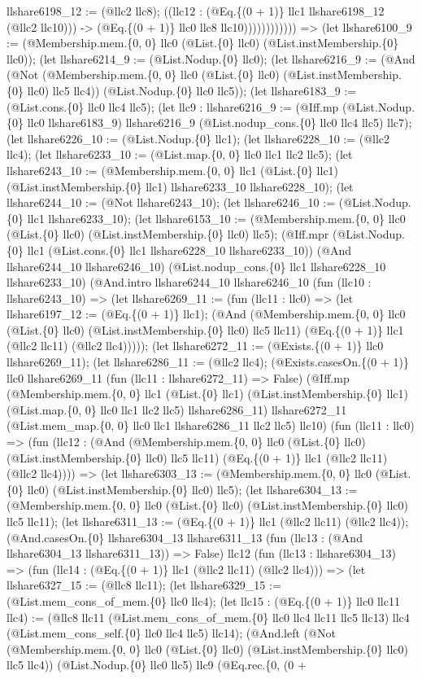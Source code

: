 \documentclass[11pt]{article}
\begin{document}
llshare6198\_12 := (@llc2 llc8); ((llc12 : (@Eq.\{(0 + 1)\} llc1 llshare6198\_12 (@llc2 llc10))) -> (@Eq.\{(0 + 1)\} llc0 llc8 llc10)))))))))))) => (let llshare6100\_9 := (@Membership.mem.\{0, 0\} llc0 (@List.\{0\} llc0) (@List.instMembership.\{0\} llc0)); (let llshare6214\_9 := (@List.Nodup.\{0\} llc0); (let llshare6216\_9 := (@And (@Not (@Membership.mem.\{0, 0\} llc0 (@List.\{0\} llc0) (@List.instMembership.\{0\} llc0) llc5 llc4)) (@List.Nodup.\{0\} llc0 llc5)); (let llshare6183\_9 := (@List.cons.\{0\} llc0 llc4 llc5); (let llc9 : llshare6216\_9 := (@Iff.mp (@List.Nodup.\{0\} llc0 llshare6183\_9) llshare6216\_9 (@List.nodup\_cons.\{0\} llc0 llc4 llc5) llc7); (let llshare6226\_10 := (@List.Nodup.\{0\} llc1); (let llshare6228\_10 := (@llc2 llc4); (let llshare6233\_10 := (@List.map.\{0, 0\} llc0 llc1 llc2 llc5); (let llshare6243\_10 := (@Membership.mem.\{0, 0\} llc1 (@List.\{0\} llc1) (@List.instMembership.\{0\} llc1) llshare6233\_10 llshare6228\_10); (let llshare6244\_10 := (@Not llshare6243\_10); (let llshare6246\_10 := (@List.Nodup.\{0\} llc1 llshare6233\_10); (let llshare6153\_10 := (@Membership.mem.\{0, 0\} llc0 (@List.\{0\} llc0) (@List.instMembership.\{0\} llc0) llc5); (@Iff.mpr (@List.Nodup.\{0\} llc1 (@List.cons.\{0\} llc1 llshare6228\_10 llshare6233\_10)) (@And llshare6244\_10 llshare6246\_10) (@List.nodup\_cons.\{0\} llc1 llshare6228\_10 llshare6233\_10) (@And.intro llshare6244\_10 llshare6246\_10 (fun (llc10 : llshare6243\_10) => (let llshare6269\_11 := (fun (llc11 : llc0) => (let llshare6197\_12 := (@Eq.\{(0 + 1)\} llc1); (@And (@Membership.mem.\{0, 0\} llc0 (@List.\{0\} llc0) (@List.instMembership.\{0\} llc0) llc5 llc11) (@Eq.\{(0 + 1)\} llc1 (@llc2 llc11) (@llc2 llc4))))); (let llshare6272\_11 := (@Exists.\{(0 + 1)\} llc0 llshare6269\_11); (let llshare6286\_11 := (@llc2 llc4); (@Exists.casesOn.\{(0 + 1)\} llc0 llshare6269\_11 (fun (llc11 : llshare6272\_11) => False) (@Iff.mp (@Membership.mem.\{0, 0\} llc1 (@List.\{0\} llc1) (@List.instMembership.\{0\} llc1) (@List.map.\{0, 0\} llc0 llc1 llc2 llc5) llshare6286\_11) llshare6272\_11 (@List.mem\_map.\{0, 0\} llc0 llc1 llshare6286\_11 llc2 llc5) llc10) (fun (llc11 : llc0) => (fun (llc12 : (@And (@Membership.mem.\{0, 0\} llc0 (@List.\{0\} llc0) (@List.instMembership.\{0\} llc0) llc5 llc11) (@Eq.\{(0 + 1)\} llc1 (@llc2 llc11) (@llc2 llc4)))) => (let llshare6303\_13 := (@Membership.mem.\{0, 0\} llc0 (@List.\{0\} llc0) (@List.instMembership.\{0\} llc0) llc5); (let llshare6304\_13 := (@Membership.mem.\{0, 0\} llc0 (@List.\{0\} llc0) (@List.instMembership.\{0\} llc0) llc5 llc11); (let llshare6311\_13 := (@Eq.\{(0 + 1)\} llc1 (@llc2 llc11) (@llc2 llc4)); (@And.casesOn.\{0\} llshare6304\_13 llshare6311\_13 (fun (llc13 : (@And llshare6304\_13 llshare6311\_13)) => False) llc12 (fun (llc13 : llshare6304\_13) => (fun (llc14 : (@Eq.\{(0 + 1)\} llc1 (@llc2 llc11) (@llc2 llc4))) => (let llshare6327\_15 := (@llc8 llc11); (let llshare6329\_15 := (@List.mem\_cons\_of\_mem.\{0\} llc0 llc4); (let llc15 : (@Eq.\{(0 + 1)\} llc0 llc11 llc4) := (@llc8 llc11 (@List.mem\_cons\_of\_mem.\{0\} llc0 llc4 llc11 llc5 llc13) llc4 (@List.mem\_cons\_self.\{0\} llc0 llc4 llc5) llc14); (@And.left (@Not (@Membership.mem.\{0, 0\} llc0 (@List.\{0\} llc0) (@List.instMembership.\{0\} llc0) llc5 llc4)) (@List.Nodup.\{0\} llc0 llc5) llc9 (@Eq.rec.\{0, (0 + 
\end{document}
